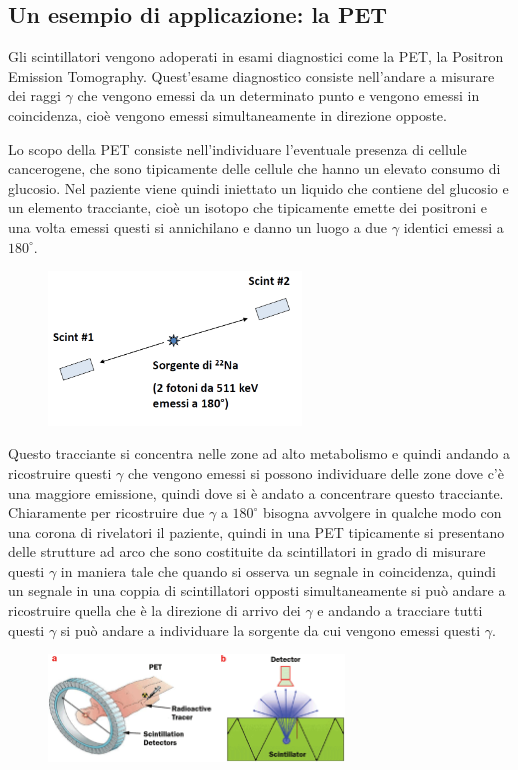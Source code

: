 \subsection{Un esempio di applicazione: la PET}
Gli scintillatori vengono adoperati in esami diagnostici come la PET, la Positron Emission Tomography. Quest'esame diagnostico consiste nell'andare a misurare dei raggi $\gamma$ che vengono emessi da un determinato punto e vengono emessi in coincidenza, cioè vengono emessi simultaneamente in direzione opposte.

Lo scopo della PET consiste nell'individuare l'eventuale presenza di cellule cancerogene, che sono tipicamente delle cellule che hanno un elevato consumo di glucosio. Nel paziente viene quindi iniettato un liquido che contiene del glucosio e un elemento tracciante, cioè un isotopo che tipicamente emette dei positroni e una volta emessi questi si annichilano e danno un luogo a due $\gamma$ identici emessi a $180^{\circ}$.
\begin{figure}[H]
   \centering
   \includegraphics[width=0.6\textwidth]{immagini/pet_1.png}
\end{figure}
Questo tracciante si concentra nelle zone ad alto metabolismo e quindi andando a ricostruire questi $\gamma$ che vengono emessi si possono individuare delle zone dove c'è una maggiore emissione, quindi dove si è andato a concentrare questo tracciante. Chiaramente per ricostruire due $\gamma$ a $180^{\circ}$ bisogna avvolgere in qualche modo con una corona di rivelatori il paziente, quindi in una PET tipicamente si presentano delle strutture ad arco che sono costituite da scintillatori in grado di misurare questi $\gamma$ in maniera tale che quando si osserva un segnale in coincidenza, quindi un segnale in una coppia di scintillatori opposti simultaneamente si può andare a ricostruire quella che è la direzione di arrivo dei $\gamma$ e andando a tracciare tutti questi $\gamma$ si può andare a individuare la sorgente da cui vengono emessi questi $\gamma$.
\begin{figure}[H]
   \centering
   \includegraphics[width=0.7\textwidth]{immagini/pet_2.png}
\end{figure}
